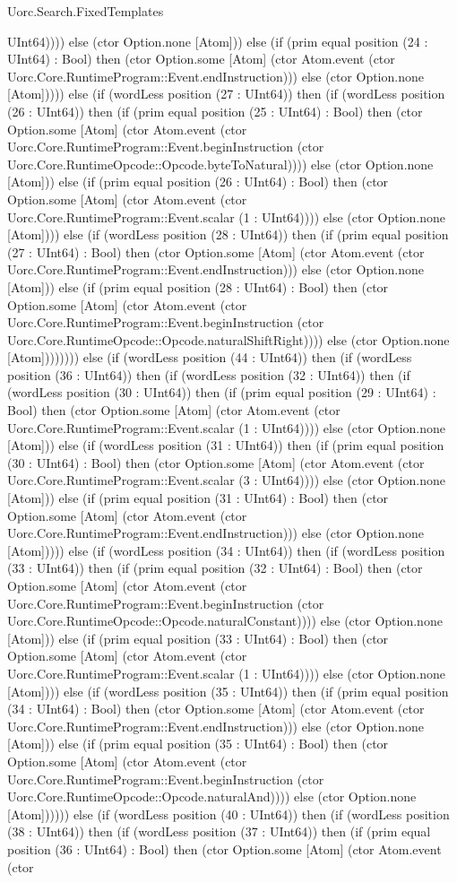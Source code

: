 \begin{lexlean}{Uorc.Search.FixedTemplates}
\begin{semanticmodule}
{UInt64)))) else (ctor Option.none [Atom])) else (if (prim equal position (24 : UInt64) : Bool) then (ctor Option.some [Atom] (ctor Atom.event (ctor Uorc.Core.RuntimeProgram::Event.endInstruction))) else (ctor Option.none [Atom])))) else (if (wordLess position (27 : UInt64)) then (if (wordLess position (26 : UInt64)) then (if (prim equal position (25 : UInt64) : Bool) then (ctor Option.some [Atom] (ctor Atom.event (ctor Uorc.Core.RuntimeProgram::Event.beginInstruction (ctor Uorc.Core.RuntimeOpcode::Opcode.byteToNatural)))) else (ctor Option.none [Atom])) else (if (prim equal position (26 : UInt64) : Bool) then (ctor Option.some [Atom] (ctor Atom.event (ctor Uorc.Core.RuntimeProgram::Event.scalar (1 : UInt64)))) else (ctor Option.none [Atom]))) else (if (wordLess position (28 : UInt64)) then (if (prim equal position (27 : UInt64) : Bool) then (ctor Option.some [Atom] (ctor Atom.event (ctor Uorc.Core.RuntimeProgram::Event.endInstruction))) else (ctor Option.none [Atom])) else (if (prim equal position (28 : UInt64) : Bool) then (ctor Option.some [Atom] (ctor Atom.event (ctor Uorc.Core.RuntimeProgram::Event.beginInstruction (ctor Uorc.Core.RuntimeOpcode::Opcode.naturalShiftRight)))) else (ctor Option.none [Atom]))))))) else (if (wordLess position (44 : UInt64)) then (if (wordLess position (36 : UInt64)) then (if (wordLess position (32 : UInt64)) then (if (wordLess position (30 : UInt64)) then (if (prim equal position (29 : UInt64) : Bool) then (ctor Option.some [Atom] (ctor Atom.event (ctor Uorc.Core.RuntimeProgram::Event.scalar (1 : UInt64)))) else (ctor Option.none [Atom])) else (if (wordLess position (31 : UInt64)) then (if (prim equal position (30 : UInt64) : Bool) then (ctor Option.some [Atom] (ctor Atom.event (ctor Uorc.Core.RuntimeProgram::Event.scalar (3 : UInt64)))) else (ctor Option.none [Atom])) else (if (prim equal position (31 : UInt64) : Bool) then (ctor Option.some [Atom] (ctor Atom.event (ctor Uorc.Core.RuntimeProgram::Event.endInstruction))) else (ctor Option.none [Atom])))) else (if (wordLess position (34 : UInt64)) then (if (wordLess position (33 : UInt64)) then (if (prim equal position (32 : UInt64) : Bool) then (ctor Option.some [Atom] (ctor Atom.event (ctor Uorc.Core.RuntimeProgram::Event.beginInstruction (ctor Uorc.Core.RuntimeOpcode::Opcode.naturalConstant)))) else (ctor Option.none [Atom])) else (if (prim equal position (33 : UInt64) : Bool) then (ctor Option.some [Atom] (ctor Atom.event (ctor Uorc.Core.RuntimeProgram::Event.scalar (1 : UInt64)))) else (ctor Option.none [Atom]))) else (if (wordLess position (35 : UInt64)) then (if (prim equal position (34 : UInt64) : Bool) then (ctor Option.some [Atom] (ctor Atom.event (ctor Uorc.Core.RuntimeProgram::Event.endInstruction))) else (ctor Option.none [Atom])) else (if (prim equal position (35 : UInt64) : Bool) then (ctor Option.some [Atom] (ctor Atom.event (ctor Uorc.Core.RuntimeProgram::Event.beginInstruction (ctor Uorc.Core.RuntimeOpcode::Opcode.naturalAnd)))) else (ctor Option.none [Atom]))))) else (if (wordLess position (40 : UInt64)) then (if (wordLess position (38 : UInt64)) then (if (wordLess position (37 : UInt64)) then (if (prim equal position (36 : UInt64) : Bool) then (ctor Option.some [Atom] (ctor Atom.event (ctor }
\end{semanticmodule}
\end{lexlean}
